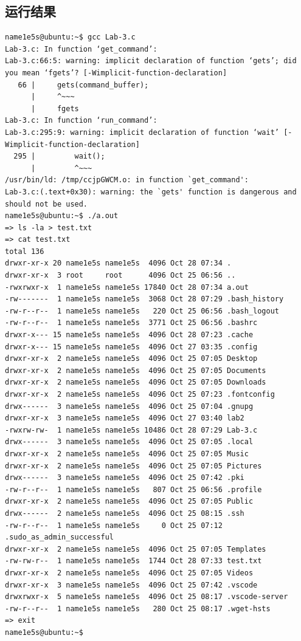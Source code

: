 \documentclass[blue,normal,cn]{elegantnote}
\begin{document}
\subsection{运行结果}
\begin{lstlisting}
name1e5s@ubuntu:~$ gcc Lab-3.c
Lab-3.c: In function ‘get_command’:
Lab-3.c:66:5: warning: implicit declaration of function ‘gets’; did you mean ‘fgets’? [-Wimplicit-function-declaration]
   66 |     gets(command_buffer);
      |     ^~~~
      |     fgets
Lab-3.c: In function ‘run_command’:
Lab-3.c:295:9: warning: implicit declaration of function ‘wait’ [-Wimplicit-function-declaration]
  295 |         wait();
      |         ^~~~
/usr/bin/ld: /tmp/ccjpGWCM.o: in function `get_command':
Lab-3.c:(.text+0x30): warning: the `gets' function is dangerous and should not be used.
name1e5s@ubuntu:~$ ./a.out
=> ls -la > test.txt
=> cat test.txt
total 136
drwxr-xr-x 20 name1e5s name1e5s  4096 Oct 28 07:34 .
drwxr-xr-x  3 root     root      4096 Oct 25 06:56 ..
-rwxrwxr-x  1 name1e5s name1e5s 17840 Oct 28 07:34 a.out
-rw-------  1 name1e5s name1e5s  3068 Oct 28 07:29 .bash_history
-rw-r--r--  1 name1e5s name1e5s   220 Oct 25 06:56 .bash_logout
-rw-r--r--  1 name1e5s name1e5s  3771 Oct 25 06:56 .bashrc
drwxr-x--- 15 name1e5s name1e5s  4096 Oct 28 07:23 .cache
drwxr-x--- 15 name1e5s name1e5s  4096 Oct 27 03:35 .config
drwxr-xr-x  2 name1e5s name1e5s  4096 Oct 25 07:05 Desktop
drwxr-xr-x  2 name1e5s name1e5s  4096 Oct 25 07:05 Documents
drwxr-xr-x  2 name1e5s name1e5s  4096 Oct 25 07:05 Downloads
drwxr-xr-x  2 name1e5s name1e5s  4096 Oct 25 07:23 .fontconfig
drwx------  3 name1e5s name1e5s  4096 Oct 25 07:04 .gnupg
drwxr-xr-x  3 name1e5s name1e5s  4096 Oct 27 03:40 lab2
-rwxrw-rw-  1 name1e5s name1e5s 10486 Oct 28 07:29 Lab-3.c
drwx------  3 name1e5s name1e5s  4096 Oct 25 07:05 .local
drwxr-xr-x  2 name1e5s name1e5s  4096 Oct 25 07:05 Music
drwxr-xr-x  2 name1e5s name1e5s  4096 Oct 25 07:05 Pictures
drwx------  3 name1e5s name1e5s  4096 Oct 25 07:42 .pki
-rw-r--r--  1 name1e5s name1e5s   807 Oct 25 06:56 .profile
drwxr-xr-x  2 name1e5s name1e5s  4096 Oct 25 07:05 Public
drwx------  2 name1e5s name1e5s  4096 Oct 25 08:15 .ssh
-rw-r--r--  1 name1e5s name1e5s     0 Oct 25 07:12 .sudo_as_admin_successful
drwxr-xr-x  2 name1e5s name1e5s  4096 Oct 25 07:05 Templates
-rw-rw-r--  1 name1e5s name1e5s  1744 Oct 28 07:33 test.txt
drwxr-xr-x  2 name1e5s name1e5s  4096 Oct 25 07:05 Videos
drwxr-xr-x  3 name1e5s name1e5s  4096 Oct 25 07:42 .vscode
drwxrwxr-x  5 name1e5s name1e5s  4096 Oct 25 08:17 .vscode-server
-rw-r--r--  1 name1e5s name1e5s   280 Oct 25 08:17 .wget-hsts
=> exit
name1e5s@ubuntu:~$
\end{lstlisting}
\end{document}
